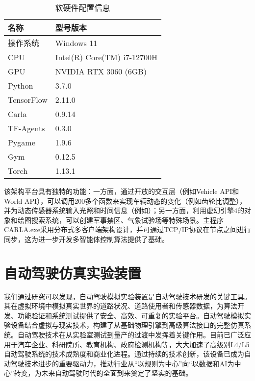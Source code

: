 \begin{table}[htbp]
	\centering
	\caption{软硬件配置信息}
	\label{tab:config}
	\begin{tabular}{ll}
		\toprule
		\textbf{名称}         & \textbf{型号版本}               \\
		\midrule
		操作系统            & Windows 11                     \\
		CPU               & Intel(R) Core(TM) i7-12700H    \\
		GPU               & NVIDIA RTX 3060 (6GB)          \\
		Python            & 3.7.0                          \\
		TensorFlow        & 2.11.0                         \\
		Carla             & 0.9.14                         \\
		TF-Agents         & 0.3.0                          \\
		Pygame            & 1.9.6                          \\
		Gym               & 0.12.5                         \\
		Torch             & 1.13.1                         \\
		\bottomrule
	\end{tabular}
\end{table}


该架构平台具有独特的功能：一方面，通过开放的交互层（例如Vehicle API和World API），可以调用200多个函数来实现车辆动态的变化（例如齿轮比调整），并为动态传感器系统输入光照和时间信息（例如）；另一方面，利用虚幻引擎4的对象和绘图搜索系统，可以创建军事禁区、气象试验场等特殊场景。主程序CARLA.exe采用分布式多客户端架构设计，并可通过TCP/IP协议在节点之间进行同步，这为进一步开发多智能体控制算法提供了基础。

\section{自动驾驶仿真实验装置}

我们通过研究可以发现，自动驾驶模拟实验装置是自动驾驶技术研发的关键工具。其在虚拟环境中模拟真实世界的道路状况、道路使用者和传感器数据，为算法开发、功能验证和系统测试提供了安全、高效、可重复的实验平台。自动驾驶模拟实验设备结合虚拟与现实技术，构建了从基础物理引擎到高级算法接口的完整仿真系统。自动驾驶技术在从实验室测试到量产的过渡中发挥着关键作用。目前已广泛应用于汽车企业、科研院所、教育机构、政府检测机构等，大大加速了高级别L4/L5自动驾驶系统的技术成熟度和商业化进程。通过持续的技术创新，该设备已成为自动驾驶技术进步的重要驱动力，推动行业从“以规则为中心”向“以数据和AI为中心”转变，为未来自动驾驶时代的全面到来奠定了坚实的基础。


